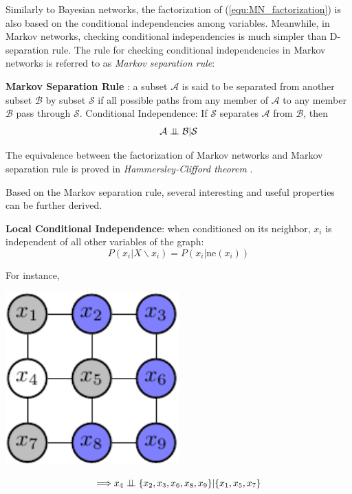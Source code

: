 Similarly to Bayesian networks, the factorization of (\ref{equ:MN_factorization}) is also based on the conditional independencies among variables.      
Meanwhile, in Markov networks, checking conditional independencies is much simpler than D-separation rule. The rule for checking  conditional independencies 
in Markov networks is referred to as \emph{Markov separation rule}:
\begin{theorem}
\textbf{Markov Separation Rule} : a subset $\mathcal{A}$ is said to be separated from another subset $\mathcal{B}$ 
by subset $\mathcal{S}$ if all possible paths from any member of $\mathcal{A}$ to any member $\mathcal{B}$
pass through $\mathcal{S}$. 
 Conditional Independence: If $\mathcal{S}$ separates $\mathcal{A}$ from $\mathcal{B}$, then
 \begin{equation*}
 \mathcal{A} \perp\!\!\!\perp \mathcal{B} | \mathcal{S}
  \end{equation*}
\end{theorem}
The equivalence between the factorization of Markov networks and Markov separation rule is proved in \emph{Hammersley-Clifford theorem} \citep{HC_theorem}.  


Based on the Markov separation rule, several interesting and useful properties can be further derived.   
\begin{corollary}
\textbf{Local Conditional Independence}:
  when conditioned on its neighbor, $x_i$ is  independent of all other variables of the graph: 
   \begin{equation*}
    P(x_i|X \backslash x_i)= P(x_i|\text{ne}(x_i))
   \end{equation*}
\end{corollary}
For instance, \newline\newline 
\begin{minipage}[c]{0.5\textwidth}   
	\centering
	\includegraphics[width=0.5\textwidth]{./Figures/markov_net_1.pdf}
\end{minipage}
\begin{minipage}[c]{0.5\textwidth}
   \begin{equation*}
 \Longrightarrow x_4 \perp\!\!\!\perp \{x_2,x_3,x_6,x_8,x_9 \}|\{x_1,x_5,x_7\}
   \end{equation*}
\end{minipage}
\newline 

